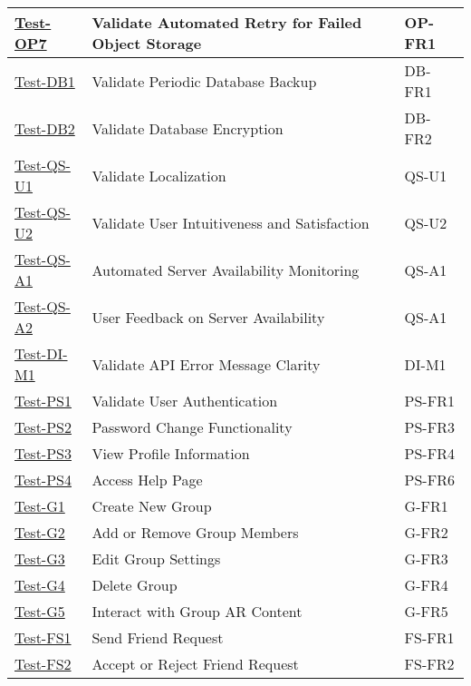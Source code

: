 \documentclass[12pt, titlepage]{article}
\begin{document}
\begin{enumerate}
\begin{table}[h!]
\begin{tabular}{|l|l|l|}
        \hline
        \hyperref[itm:Test-OP7]{Test-OP7} & Validate Automated Retry for Failed Object Storage & OP-FR1 \\
        \hline
        \hyperref[itm:Test-DB1]{Test-DB1} & Validate Periodic Database Backup & DB-FR1 \\
        \hline
        \hyperref[itm:Test-DB2]{Test-DB2} & Validate Database Encryption & DB-FR2 \\
        \hline
        \hyperref[itm:Test-QS-U1]{Test-QS-U1} & Validate Localization & QS-U1 \\
        \hline
        \hyperref[itm:Test-QS-U2]{Test-QS-U2} & Validate User Intuitiveness and Satisfaction & QS-U2 \\
        \hline
        \hyperref[itm:Test-QS-A1]{Test-QS-A1} & Automated Server Availability Monitoring & QS-A1 \\
        \hline
        \hyperref[itm:Test-QS-A2]{Test-QS-A2} & User Feedback on Server Availability & QS-A1 \\
        \hline
        \hyperref[itm:Test-DI-M1]{Test-DI-M1} & Validate API Error Message Clarity & DI-M1 \\
        \hline
        \hyperref[itm:Test-PS1]{Test-PS1} & Validate User Authentication & PS-FR1 \\
        \hline
        \hyperref[itm:Test-PS2]{Test-PS2} & Password Change Functionality & PS-FR3 \\
        \hline
        \hyperref[itm:Test-PS3]{Test-PS3} & View Profile Information & PS-FR4 \\
        \hline
        \hyperref[itm:Test-PS4]{Test-PS4} & Access Help Page & PS-FR6 \\
        \hline
        \hyperref[itm:Test-G1]{Test-G1} & Create New Group & G-FR1 \\
        \hline
        \hyperref[itm:Test-G2]{Test-G2} & Add or Remove Group Members & G-FR2 \\
        \hline
        \hyperref[itm:Test-G3]{Test-G3} & Edit Group Settings & G-FR3 \\
        \hline
        \hyperref[itm:Test-G4]{Test-G4} & Delete Group & G-FR4 \\
        \hline
        \hyperref[itm:Test-G5]{Test-G5} & Interact with Group AR Content & G-FR5 \\
        \hline
        \hyperref[itm:Test-FS1]{Test-FS1} & Send Friend Request & FS-FR1 \\
        \hline
        \hyperref[itm:Test-FS2]{Test-FS2} & Accept or Reject Friend Request & FS-FR2 \\

\end{tabular}
\end{table}
\end{enumerate}
\end{document}
